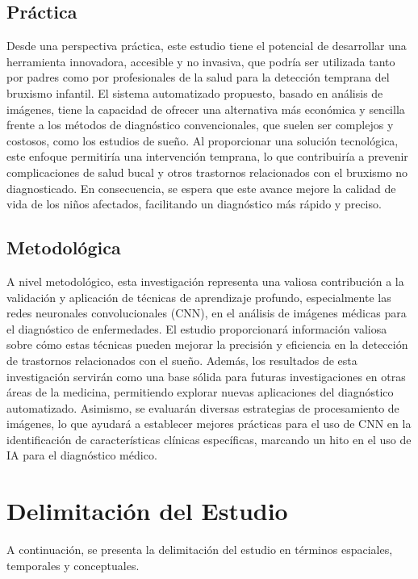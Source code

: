\subsection{Práctica}
Desde una perspectiva práctica, este estudio tiene el potencial de desarrollar una herramienta innovadora, accesible y no invasiva, que podría ser utilizada tanto por padres como por profesionales de la salud para la detección temprana del bruxismo infantil. El sistema automatizado propuesto, basado en análisis de imágenes, tiene la capacidad de ofrecer una alternativa más económica y sencilla frente a los métodos de diagnóstico convencionales, que suelen ser complejos y costosos, como los estudios de sueño. Al proporcionar una solución tecnológica, este enfoque permitiría una intervención temprana, lo que contribuiría a prevenir complicaciones de salud bucal y otros trastornos relacionados con el bruxismo no diagnosticado. En consecuencia, se espera que este avance mejore la calidad de vida de los niños afectados, facilitando un diagnóstico más rápido y preciso.

\subsection{Metodológica}
A nivel metodológico, esta investigación representa una valiosa contribución a la validación y aplicación de técnicas de aprendizaje profundo, especialmente las redes neuronales convolucionales (CNN), en el análisis de imágenes médicas para el diagnóstico de enfermedades. El estudio proporcionará información valiosa sobre cómo estas técnicas pueden mejorar la precisión y eficiencia en la detección de trastornos relacionados con el sueño. Además, los resultados de esta investigación servirán como una base sólida para futuras investigaciones en otras áreas de la medicina, permitiendo explorar nuevas aplicaciones del diagnóstico automatizado. Asimismo, se evaluarán diversas estrategias de procesamiento de imágenes, lo que ayudará a establecer mejores prácticas para el uso de CNN en la identificación de características clínicas específicas, marcando un hito en el uso de IA para el diagnóstico médico.

\section{Delimitación del Estudio}
A continuación, se presenta la delimitación del estudio en términos espaciales, temporales y conceptuales.

